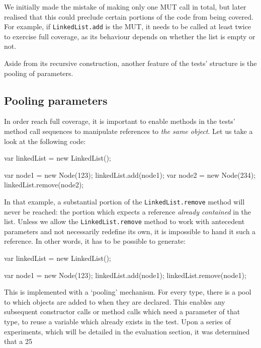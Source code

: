 We initially made the mistake of making only one MUT call in total, but later realised that this could preclude certain portions of the code from being covered. For example, if \texttt{LinkedList.add} is the MUT, it needs to be called at least twice to exercise full coverage, as its behaviour depends on whether the list is empty or not.

Aside from its recursive construction, another feature of the tests' structure is the pooling of parameters.

\subsection{Pooling parameters}
In order reach full coverage, it is important to enable methods in the tests' method call sequences to manipulate references to \emph{the same object}. Let us take a look at the following code:

\begin{code}[caption=Unreachable code,label=unreachable]
var linkedList = new LinkedList();

var node1 = new Node(123);
linkedList.add(node1);
var node2 = new Node(234);
linkedList.remove(node2);
\end{code}

In that example, a substantial portion of the \texttt{LinkedList.remove} method will never be reached: the portion which expects a reference \emph{already contained} in the list. Unless we allow the \texttt{LinkedList.remove} method to work with antecedent parameters and not necessarily redefine its own, it is impossible to hand it such a reference. In other words, it has to be possible to generate:

\begin{code}[caption=Pooling,label=pooling]
var linkedList = new LinkedList();

var node1 = new Node(123);
linkedList.add(node1);
linkedList.remove(node1);
\end{code}

This is implemented with a `pooling' mechanism. For every type, there is a pool to which objects are added to when they are declared. This enables any subsequent constructor calls or method calls which need a parameter of that type, to reuse a variable which already exists in the test. Upon a series of experiments, which will be detailed in the evaluation section, it was determined that a 25%

